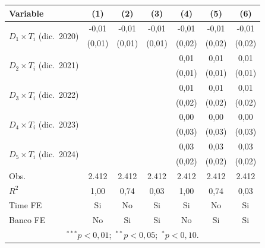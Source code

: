 \begin{center}
\scriptsize
\renewcommand{\arraystretch}{1.1}
\begin{tabular}{lcccccc}
\hline
Variable & (1) & (2) & (3) & (4) & (5) & (6) \\
\hline\hline
\multirow{2}{*}{$D_{1} \times T_i$ (dic.~2020)} & -0,01 & -0,01 & -0,01 & -0,01 & -0,01 & -0,01 \\
 & (0,01) & (0,01) & (0,01) & (0,02) & (0,02) & (0,02) \\
\multirow{2}{*}{$D_{2} \times T_i$ (dic.~2021)} &  &  &  & 0,01 & 0,01 & 0,01 \\
 &  &  &  & (0,01) & (0,01) & (0,01) \\
\multirow{2}{*}{$D_{3} \times T_i$ (dic.~2022)} &  &  &  & 0,01 & 0,01 & 0,01 \\
 &  &  &  & (0,02) & (0,02) & (0,02) \\
\multirow{2}{*}{$D_{4} \times T_i$ (dic.~2023)} &  &  &  & 0,00 & 0,00 & 0,00 \\
 &  &  &  & (0,03) & (0,03) & (0,03) \\
\multirow{2}{*}{$D_{5} \times T_i$ (dic.~2024)} &  &  &  & 0,03 & 0,03 & 0,03 \\
 &  &  &  & (0,02) & (0,02) & (0,02) \\
\hline
Obs. & 2.412 & 2.412 & 2.412 & 2.412 & 2.412 & 2.412 \\
$R^2$ & 1,00 & 0,74 & 0,03 & 1,00 & 0,74 & 0,03 \\
Time FE & Si & No & Si & Si & No & Si \\
Banco FE & No & Si & Si & No & Si & Si \\
\hline
\multicolumn{7}{c}{\tiny $^{***}p<0{,}01$;\ $^{**}p<0{,}05$;\ $^{*}p<0{,}10$.}\\
\hline
\end{tabular}
\end{center}
